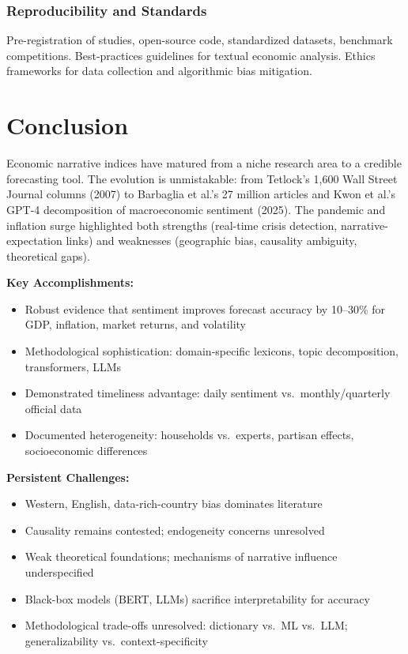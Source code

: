\documentclass[12pt,a4paper]{article}
\begin{document}
\subsubsection{Reproducibility and Standards}

Pre-registration of studies, open-source code, standardized datasets, benchmark competitions. Best-practices guidelines for textual economic analysis. Ethics frameworks for data collection and algorithmic bias mitigation.

\section{Conclusion}
\label{sec:conclusion}

Economic narrative indices have matured from a niche research area to a credible forecasting tool. The evolution is unmistakable: from Tetlock's 1,600 Wall Street Journal columns (2007) to Barbaglia et al.'s 27 million articles and Kwon et al.'s GPT-4 decomposition of macroeconomic sentiment (2025). The pandemic and inflation surge highlighted both strengths (real-time crisis detection, narrative-expectation links) and weaknesses (geographic bias, causality ambiguity, theoretical gaps).

\textbf{Key Accomplishments:}
\begin{itemize}
\item Robust evidence that sentiment improves forecast accuracy by 10--30\% for GDP, inflation, market returns, and volatility
\item Methodological sophistication: domain-specific lexicons, topic decomposition, transformers, LLMs
\item Demonstrated timeliness advantage: daily sentiment vs.\ monthly/quarterly official data
\item Documented heterogeneity: households vs.\ experts, partisan effects, socioeconomic differences
\end{itemize}

\textbf{Persistent Challenges:}
\begin{itemize}
\item Western, English, data-rich-country bias dominates literature
\item Causality remains contested; endogeneity concerns unresolved
\item Weak theoretical foundations; mechanisms of narrative influence underspecified
\item Black-box models (BERT, LLMs) sacrifice interpretability for accuracy
\item Methodological trade-offs unresolved: dictionary vs.\ ML vs.\ LLM; generalizability vs.\ context-specificity
\end{itemize}
\end{document}

